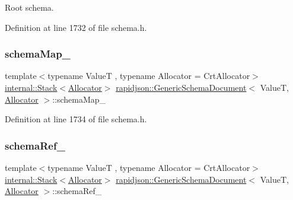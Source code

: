 Root schema. 



Definition at line 1732 of file schema.\+h.

\mbox{\label{classrapidjson_1_1_generic_schema_document_adb08443004b8a6978bad470f2c32f998}} 
\subsubsection{\texorpdfstring{schemaMap\_}{schemaMap\_}}
{\footnotesize\ttfamily template$<$typename ValueT , typename Allocator  = Crt\+Allocator$>$ \\
\mbox{\hyperlink{classrapidjson_1_1internal_1_1_stack}{internal\+::\+Stack}}$<$\mbox{\hyperlink{classrapidjson_1_1_allocator}{Allocator}}$>$ \mbox{\hyperlink{classrapidjson_1_1_generic_schema_document}{rapidjson\+::\+Generic\+Schema\+Document}}$<$ ValueT, \mbox{\hyperlink{classrapidjson_1_1_allocator}{Allocator}} $>$\+::schema\+Map\+\_\+\hspace{0.3cm}{\ttfamily [private]}}



Definition at line 1734 of file schema.\+h.

\mbox{\label{classrapidjson_1_1_generic_schema_document_ad85e2cdeb3cd92a19a4a9ac49fa24496}} 
\subsubsection{\texorpdfstring{schemaRef\_}{schemaRef\_}}
{\footnotesize\ttfamily template$<$typename ValueT , typename Allocator  = Crt\+Allocator$>$ \\
\mbox{\hyperlink{classrapidjson_1_1internal_1_1_stack}{internal\+::\+Stack}}$<$\mbox{\hyperlink{classrapidjson_1_1_allocator}{Allocator}}$>$ \mbox{\hyperlink{classrapidjson_1_1_generic_schema_document}{rapidjson\+::\+Generic\+Schema\+Document}}$<$ ValueT, \mbox{\hyperlink{classrapidjson_1_1_allocator}{Allocator}} $>$\+::schema\+Ref\+\_\+\hspace{0.3cm}{\ttfamily [private]}}



